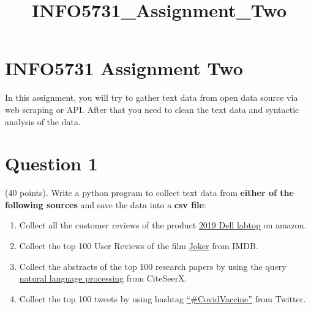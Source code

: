 \documentclass[11pt]{article}
\title{INFO5731\_Assignment\_Two}
\begin{document}
    
    \maketitle
    
    

    
    

    \hypertarget{info5731-assignment-two}{%
\section{\texorpdfstring{\textbf{INFO5731 Assignment
Two}}{INFO5731 Assignment Two}}\label{info5731-assignment-two}}

In this assignment, you will try to gather text data from open data
source via web scraping or API. After that you need to clean the text
data and syntactic analysis of the data.

    \hypertarget{question-1}{%
\section{\texorpdfstring{\textbf{Question
1}}{Question 1}}\label{question-1}}

    (40 points). Write a python program to collect text data from
\textbf{either of the following sources} and save the data into a
\textbf{csv file}:

\begin{enumerate}
\def\labelenumi{(\arabic{enumi})}
\item
  Collect all the customer reviews of the product
  \href{https://www.amazon.com/Dell-Inspiron-5000-5570-Laptop/dp/B07N49F51N/ref=sr_1_11?crid=1IJ7UWF2F4GHH\&keywords=dell\%2Bxps\%2B15\&qid=1580173569\&sprefix=dell\%2Caps\%2C181\&sr=8-11\&th=1}{2019
  Dell labtop} on amazon.
\item
  Collect the top 100 User Reviews of the film
  \href{https://www.imdb.com/title/tt7286456/reviews?ref_=tt_urv}{Joker}
  from IMDB.
\item
  Collect the abstracts of the top 100 research papers by using the
  query
  \href{https://citeseerx.ist.psu.edu/search?q=natural+language+processing\&submit.x=0\&submit.y=0\&sort=rlv\&t=doc}{natural
  language processing} from CiteSeerX.
\item
  Collect the top 100 tweets by using hashtag
  \href{https://twitter.com/hashtag/CovidVaccine}{``\#CovidVaccine''}
  from Twitter.
\end{enumerate}
\end{document}
